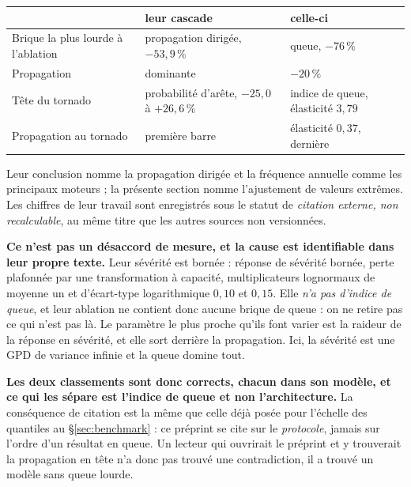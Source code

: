 \begin{center}\footnotesize
\renewcommand{\arraystretch}{1.2}
\begin{tabular}{@{}l l l@{}}
\toprule
& \textbf{leur cascade} & \textbf{celle-ci} \\
\midrule
Brique la plus lourde à l'ablation & propagation dirigée, $-53{,}9\,\%$ & queue, $-76\,\%$ \\
Propagation & dominante & $-20\,\%$ \\
Tête du tornado & probabilité d'arête, $-25{,}0$ à $+26{,}6\,\%$ & indice de queue, élasticité
$3{,}79$ \\
Propagation au tornado & première barre & élasticité $0{,}37$, dernière \\
\bottomrule
\end{tabular}
\end{center}

\vspace{4pt}
\noindent Leur conclusion nomme la propagation dirigée et la fréquence annuelle comme les
principaux moteurs ; la présente section nomme l'ajustement de valeurs extrêmes. Les chiffres de
leur travail sont enregistrés sous le statut de \emph{citation externe, non recalculable}, au
même titre que les autres sources non versionnées.

\begin{cle}
\textbf{Ce n'est pas un désaccord de mesure, et la cause est identifiable dans leur propre
texte.} Leur sévérité est bornée : réponse de sévérité bornée, perte plafonnée par une
transformation à capacité, multiplicateurs lognormaux de moyenne un et d'écart-type logarithmique
$0{,}10$ et $0{,}15$. Elle \emph{n'a pas d'indice de queue}, et leur ablation ne contient donc
aucune brique de queue : on ne retire pas ce qui n'est pas là. Le paramètre le plus proche qu'ils
font varier est la raideur de la réponse en sévérité, et elle sort derrière la propagation. Ici,
la sévérité est une GPD de variance infinie et la queue domine tout.

\textbf{Les deux classements sont donc corrects, chacun dans son modèle, et ce qui les sépare est
l'indice de queue et non l'architecture.} La conséquence de citation est la même que celle déjà
posée pour l'échelle des quantiles au \S\ref{sec:benchmark} : ce préprint se cite sur le
\emph{protocole}, jamais sur l'ordre d'un résultat en queue. Un lecteur qui ouvrirait
le préprint et y trouverait la propagation en tête n'a donc pas trouvé une contradiction, il a
trouvé un modèle sans queue lourde.
\end{cle}

